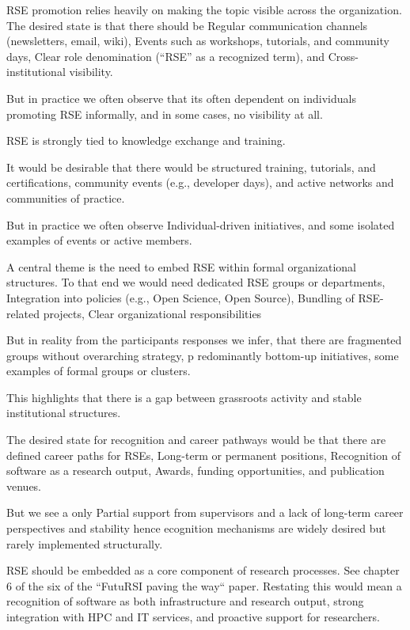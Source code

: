 \documentclass{eceasst}
\begin{document}
RSE promotion relies heavily on making the topic visible across the organization.
The desired state is that there should be
Regular communication channels (newsletters, email, wiki),
Events such as workshops, tutorials, and community days,
Clear role denomination (“RSE” as a recognized term),
and Cross-institutional visibility.

But in practice we often observe that
its often dependent on individuals promoting RSE informally,
and in some cases, no visibility at all.

RSE is strongly tied to knowledge exchange and training.

It would be desirable that there would be
structured training, tutorials, and certifications,
community events (e.g., developer days),
and active networks and communities of practice.

But in practice we often observe
Individual-driven initiatives,
and some isolated examples of events or active members.


A central theme is the need to embed RSE within formal organizational structures.
To that end we would need
dedicated RSE groups or departments,
Integration into policies (e.g., Open Science, Open Source),
Bundling of RSE-related projects,
Clear organizational responsibilities

But in reality from the participants responses we infer, that there
are fragmented groups without overarching strategy,
p redominantly bottom-up initiatives,
some examples of formal groups or clusters.

This highlights that there is a gap between grassroots activity and stable institutional structures.


The desired state for recognition and career pathways would be that there are
defined career paths for RSEs,
Long-term or permanent positions,
Recognition of software as a research output,
Awards, funding opportunities, and publication venues.

But we see a
only Partial support from supervisors
and a lack of long-term career perspectives and stability
hence ecognition mechanisms are widely desired but rarely implemented structurally.


RSE should be embedded as a core component of research processes. See chapter 6 of the six of the
``FutuRSI paving the way``\cite{mannseicher_2025_17672125} paper.
Restating this would mean a
recognition of software as both infrastructure and research output,
strong integration with HPC and IT services,
and proactive support for researchers.
\end{document}
